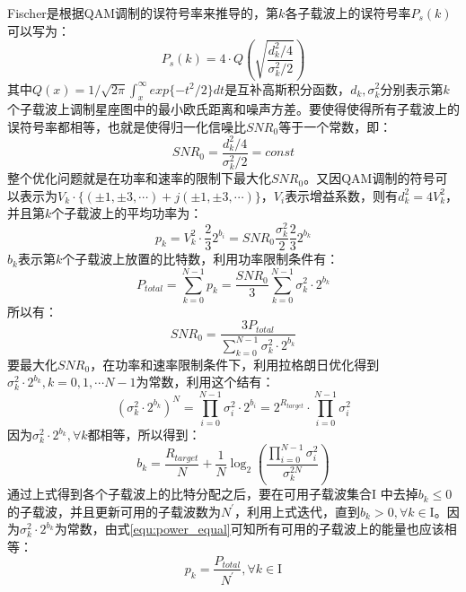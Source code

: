 Fischer是根据QAM调制的误符号率来推导的，第$k$各子载波上的误符号率$P_s(k)$可以写为：
\begin{equation}
P_s(k)=4\cdot Q\left(\sqrt{\frac{d_k^2/4}{\sigma^2_k/2}}\right)
\end{equation}
其中$Q(x)=1/\sqrt{2\pi}\int_x^{\infty}exp\{-t^2/2\}dt$是互补高斯积分函数，$d_k, \sigma^2_k$分别表示第$k$个子载波上调制星座图中的最小欧氏距离和噪声方差。要使得使得所有子载波上的误符号率都相等，也就是使得归一化信噪比$SNR_0$等于一个常数，即：
\begin{equation}
SNR_0 = \frac{d_k^2/4}{\sigma^2_k/2}=const
\end{equation}
整个优化问题就是在功率和速率的限制下最大化$SNR_0$。又因QAM调制的符号可以表示为$V_k\cdot\{(\pm 1,\pm3,\cdots)+j(\pm 1,\pm3,\cdots)\}$，$V_i$表示增益系数，则有$d_k^2=4V_k^2$，并且第$k$个子载波上的平均功率为：
\begin{equation}
\label{equ:power_equal}
p_k = V_k^2\cdot \frac{2}{3}2^{b_i} = SNR_0\frac{\sigma^2_k}{2}\frac{2}{3}2^{b_k}
\end{equation}
$b_k$表示第$k$个子载波上放置的比特数，利用功率限制条件有：
\begin{equation}
P_{total} = \sum_{k=0}^{N-1}p_k=\frac{SNR_0}{3}\sum_{k=0}^{N-1}\sigma_k^2\cdot 2^{b_k}
\end{equation}
所以有：
\begin{equation}
SNR_0 = \frac{3P_{total}}{\sum_{k=0}^{N-1}\sigma^2_k\cdot 2^{b_k}}
\end{equation}
要最大化$SNR_0$，在功率和速率限制条件下，利用拉格朗日优化得到$\sigma_k^2\cdot 2^{b_k}, k = 0,1,\cdots N-1$为常数，利用这个结有：
\begin{equation}
(\sigma_k^2\cdot 2^{b_k})^N = \prod_{i=0}^{N-1}\sigma_i^2\cdot 2^{b_i} = 2^{R_{target}}\cdot \prod_{i=0}^{N-1}\sigma_i^2
\end{equation}
因为$\sigma_k^2\cdot 2^{b_k}, \forall k$都相等，所以得到：
\begin{equation}
b_k = \frac{R_{target}}{N} +\frac{1}{N}\log_2\left(\frac{\prod_{i=0}^{N-1}\sigma_i^2}{\sigma_k^{2N}}\right)
\end{equation}
通过上式得到各个子载波上的比特分配之后，要在可用子载波集合$\mathrm{I}$ 中去掉$b_k\leq 0$的子载波，并且更新可用的子载波数为$N^{\prime}$，利用上式迭代，直到$b_k>0, \forall k\in \mathrm{I}$。因为$\sigma_k^2\cdot 2^{b_k}$为常数，由式\ref{equ:power_equal}可知所有可用的子载波上的能量也应该相等：
\begin{equation}
p_k = \frac{P_{total}}{N^\prime}, \forall k \in \mathrm{I}
\end{equation}

